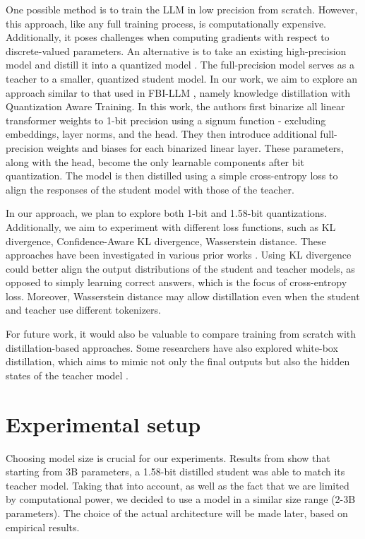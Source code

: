 \documentclass{article}
\begin{document}
One possible method is to train the LLM in low precision from scratch. However, this approach, like any full training process, is
computationally expensive. Additionally, it poses challenges when computing gradients with respect to discrete-valued parameters.
An alternative is to take an existing high-precision model and distill it into a quantized model
\cite{du2024bitdistillerunleashingpotentialsub4bit}. The full-precision model serves as a teacher to a smaller, quantized student model. 
In our work, we aim to explore an approach similar to that used in FBI-LLM \cite{fbillm}, namely knowledge distillation with Quantization Aware Training. In this work, the authors first binarize all 
linear transformer weights to 1-bit precision using a signum function - excluding embeddings, layer norms, and the head. They then introduce additional 
full-precision weights and biases for each binarized linear layer. These parameters, along with the head, become the only learnable 
components after bit quantization. The model is then distilled using a simple cross-entropy loss to align the responses of the student 
model with those of the teacher.

In our approach, we plan to explore both 1-bit and 1.58-bit quantizations. Additionally, we aim to experiment with different loss 
functions, such as KL divergence, Confidence-Aware KL divergence, Wasserstein distance. These approaches have been investigated in various
prior works \cite{du2024bitdistillerunleashingpotentialsub4bit, boizard2025crosstokenizerdistillationuniversallogit}. Using KL divergence 
could better align the output distributions of the student and teacher models, as opposed to simply learning correct answers, which is 
the focus of cross-entropy loss. Moreover, Wasserstein distance may allow distillation even when the student and teacher use different tokenizers.

For future work, it would also be valuable to compare training from scratch with distillation-based approaches. Some researchers 
have also explored white-box distillation, which aims to mimic not only the final outputs but also the hidden states of the teacher 
model \cite{gu2024minillmknowledgedistillationlarge}.

\section{Experimental setup}

Choosing model size is crucial for our experiments. Results from \cite{ma2024era1bitllmslarge} show that starting from 3B parameters, a 1.58-bit distilled student was able to match its teacher model. Taking that into account, as well as the fact that we are limited by computational power, we decided to use a model in a similar size range (2-3B parameters). The choice of the actual architecture will be made later, based on empirical results.
\end{document}
